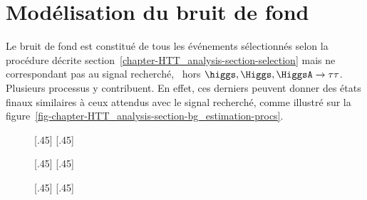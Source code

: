 \section{Modélisation du bruit de fond}\label{chapter-HTT_analysis-section-bg_estimation}
Le bruit de fond est constitué de tous les événements sélectionnés selon la procédure décrite section~\ref{chapter-HTT_analysis-section-selection} mais ne correspondant pas au signal recherché, \ie\ hors $\higgs,\Higgs,\HiggsA\to\tau\tau$.
Plusieurs processus y contribuent.
En effet, ces derniers peuvent donner des états finaux similaires à ceux attendus avec le signal recherché, comme illustré sur la figure~\ref{fig-chapter-HTT_analysis-section-bg_estimation-procs}.
\begin{figure}[b]
\centering

\vspace{\baselineskip}

[.45\textwidth]
{\vspace{\baselineskip}}
\hfill
{}[.45\textwidth]
{\vspace{\baselineskip}}

\vspace{2\baselineskip}

[.45\textwidth]
{\vspace{\baselineskip}}
\hfill
{}[.45\textwidth]
{\vspace{\baselineskip}}

\vspace{2\baselineskip}

[.45\textwidth]
{\vspace{\baselineskip}}
\hfill
{}[.45\textwidth]
{\vspace{\baselineskip}}


\end{figure}

